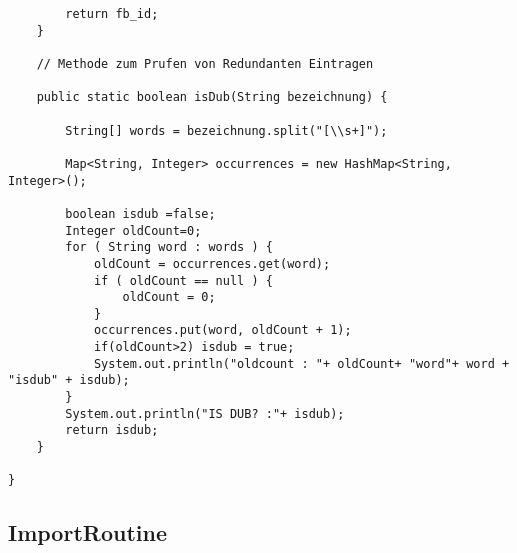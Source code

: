 \begin{lstlisting}
		return fb_id;
	}

	// Methode zum Prufen von Redundanten Eintragen

	public static boolean isDub(String bezeichnung) {

		String[] words = bezeichnung.split("[\\s+]");

		Map<String, Integer> occurrences = new HashMap<String, Integer>();

		boolean isdub =false;
		Integer oldCount=0;
		for ( String word : words ) {
			oldCount = occurrences.get(word);
			if ( oldCount == null ) {
				oldCount = 0;
			}
			occurrences.put(word, oldCount + 1);
			if(oldCount>2) isdub = true;
			System.out.println("oldcount : "+ oldCount+ "word"+ word + "isdub" + isdub);
		}
		System.out.println("IS DUB? :"+ isdub);
		return isdub;
	}

}

\end{lstlisting}

\subsection{ImportRoutine}

